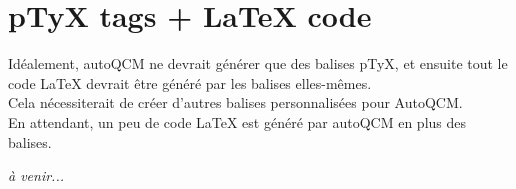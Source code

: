 \documentclass[a4paper,10pt]{article}
\begin{document}
\section{pTyX tags + LaTeX code}


Idéalement, autoQCM ne devrait générer que des balises pTyX, et ensuite tout le code LaTeX devrait être généré par les balises elles-mêmes.\\
Cela nécessiterait de créer d'autres balises personnalisées pour AutoQCM.\\
En attendant, un peu de code LaTeX est généré par autoQCM en plus des balises.

\medskip


\textit{à venir...}
\end{document}
